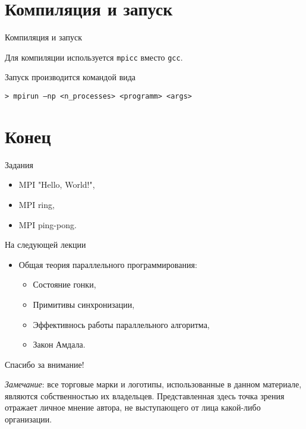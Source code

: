 \section{Компиляция и запуск}

\begin{frame}[fragile]{Компиляция и запуск}

Для компиляции используется \texttt{mpicc} вместо \texttt{gcc}.

\vfill

Запуск производится командой вида

\begin{lstlisting}
> mpirun –np <n_processes> <programm> <args>
\end{lstlisting}

\end{frame}

\section{Конец}

\begin{frame}{Задания}

\begin{itemize}
    \item MPI "Hello, World!",
    \item MPI ring,
    \item MPI ping-pong.
\end{itemize}

\end{frame}

\begin{frame}{На следующей лекции}

\begin{itemize}
    \item Общая теория параллельного программирования:
    \begin{itemize}
        \item Состояние гонки,
        \item Примитивы синхронизации,
        \item Эффективнось работы параллельного алгоритма,
        \item Закон Амдала.
    \end{itemize}
\end{itemize}

\end{frame}

\begin{frame}

{\huge{Спасибо за внимание!}\par}

\vfill

\tiny{\textit{Замечание}: все торговые марки и логотипы, использованные в данном материале, являются собственностью их владельцев. Представленная здесь точка зрения отражает личное мнение автора, не выступающего от лица какой-либо организации.}

\end{frame}


